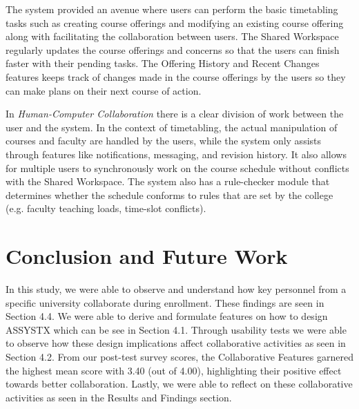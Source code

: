 The system provided an avenue where users can perform the basic timetabling tasks such as creating course offerings and modifying an existing course offering along with facilitating the collaboration between users. The Shared Workspace regularly updates the course offerings and concerns so that the users can finish faster with their pending tasks. The Offering History and Recent Changes features keeps track of changes made in the course offerings by the users so they can make plans on their next course of action.

In \textit{Human-Computer Collaboration} there is a clear division of work between the user and the system. In the context of timetabling, the actual manipulation of courses and faculty are handled by the users, while the system only assists through features like notifications, messaging, and revision history. It also allows for multiple users to synchronously work on the course schedule without conflicts with the Shared Workspace. The system also has a rule-checker module that determines whether the schedule conforms to rules that are set by the college (e.g. faculty teaching loads, time-slot conflicts).  

\section{Conclusion and Future Work}
In this study, we were able to observe and understand how key personnel from a specific university collaborate during enrollment. These findings are seen in Section 4.4. We were able to derive and formulate features on how to design ASSYSTX which can be see in Section 4.1.  Through usability tests we were able to observe how these design implications affect collaborative activities as seen in Section 4.2. From our post-test survey scores, the Collaborative Features garnered the highest mean score with 3.40 (out of 4.00), highlighting their positive effect towards better collaboration. Lastly, we were able to reflect on these collaborative activities as seen in the Results and Findings section.


